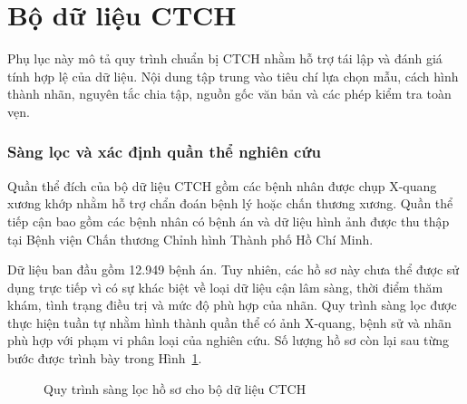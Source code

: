 \section{Bộ dữ liệu CTCH}
\label{AppendixCTCH}

Phụ lục này mô tả quy trình chuẩn bị CTCH nhằm hỗ trợ tái lập và đánh giá tính hợp lệ của dữ liệu. Nội dung tập trung vào tiêu chí lựa chọn mẫu, cách hình thành nhãn, nguyên tắc chia tập, nguồn gốc văn bản và các phép kiểm tra toàn vẹn.

\subsubsection{Sàng lọc và xác định quần thể nghiên cứu}

Quần thể đích của bộ dữ liệu CTCH gồm các bệnh nhân được chụp X-quang xương khớp nhằm hỗ trợ chẩn đoán bệnh lý hoặc chấn thương xương. Quần thể tiếp cận bao gồm các bệnh nhân có bệnh án và dữ liệu hình ảnh được thu thập tại Bệnh viện Chấn thương Chỉnh hình Thành phố Hồ Chí Minh.

Dữ liệu ban đầu gồm 12.949 bệnh án. Tuy nhiên, các hồ sơ này chưa thể được sử dụng trực tiếp vì có sự khác biệt về loại dữ liệu cận lâm sàng, thời điểm thăm khám, tình trạng điều trị và mức độ phù hợp của nhãn. Quy trình sàng lọc được thực hiện tuần tự nhằm hình thành quần thể có ảnh X-quang, bệnh sử và nhãn phù hợp với phạm vi phân loại của nghiên cứu. Số lượng hồ sơ còn lại sau từng bước được trình bày trong Hình~\ref{fig:appendix-ctch-screening-flow}.

\begin{figure}[H]
\centering
{}
\caption{Quy trình sàng lọc hồ sơ cho bộ dữ liệu CTCH}
\label{fig:appendix-ctch-screening-flow}
\end{figure}

